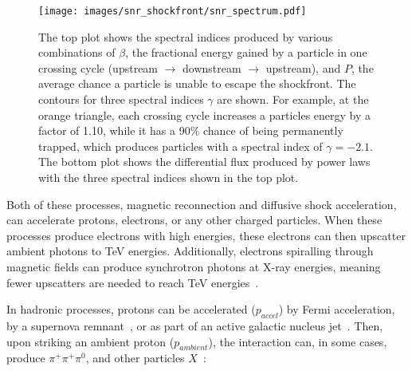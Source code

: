   \begin{figure}[!p]
    \centering
    \texttt{[image: images/snr\_shockfront/snr\_spectrum.pdf]}
    \caption[Supernova Diffuse Acceleration Spectral Indices]{
      The top plot shows the spectral indices produced by various combinations of $\beta$, the fractional energy gained by a particle in one crossing cycle (upstream $\rightarrow$ downstream $\rightarrow$ upstream), and $P$, the average chance a particle is unable to escape the shockfront.
      The contours for three spectral indices $\gamma$ are shown.
      For example, at the orange triangle, each crossing cycle increases a particles energy by a factor of 1.10, while it has a 90\% chance of being permanently trapped, which produces particles with a spectral index of $\gamma=-2.1$.
      The bottom plot shows the differential flux produced by power laws with the three spectral indices shown in the top plot.
    }\label{fig:snr_spectrum}
  \end{figure}
  
  \FloatBarrier
  
  
  


  
  Both of these processes, magnetic reconnection and diffusive shock acceleration, can accelerate protons, electrons, or any other charged particles.
  When these processes produce electrons with high energies, these electrons can then upscatter ambient photons to TeV energies.
  Additionally, electrons spiralling through magnetic fields can produce synchrotron photons at X-ray energies, meaning fewer upscatters are needed to reach TeV energies~\cite{self_compton}.

  In hadronic processes, protons can be accelerated ($p_{accel}$) by Fermi acceleration, by a supernova remnant~\cite{proton_snr_accel}, or as part of an active galactic nucleus jet~\cite{hadronic1,hadronic2}.
  Then, upon striking an ambient proton ($p_{ambient}$), the interaction can, in some cases, produce $\pi^{+}\pi^{+}\pi^{0}$, and other particles $X$~\cite{pp_pion,pp_pion2,pp_pion3}:
  
